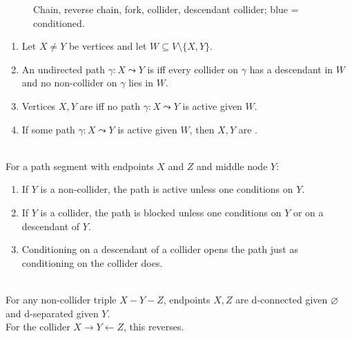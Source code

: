 \begin{figure}[H]
  \centering
  
  \caption{Chain, reverse chain, fork, collider, descendant collider; blue = conditioned.}
  \label{fig:d-separation-motifs}
\end{figure}

\begin{definition} \label{def:d-separation} 
\begin{enumerate}[label=(\roman*)]
\setlength{\itemsep}{0pt}
\item Let $X\neq Y$ be vertices and let $W\subseteq V\setminus\{X,Y\}$.
\item An undirected path $\gamma:X\leadsto Y$ is  iff every collider on $\gamma$ has a descendant in $W$ and no non-collider on $\gamma$ lies in $W$.
\item Vertices $X,Y$ are  iff no path $\gamma:X\leadsto Y$ is active given $W$.
\item If some path $\gamma:X\leadsto Y$ is active given $W$, then $X,Y$ are .
\end{enumerate}
\end{definition}

\begin{method} \label{meth:d-separation-rules} \\
For a path segment with endpoints $X$ and $Z$ and middle node $Y$:
\begin{enumerate}[label=(\roman*)]
\setlength{\itemsep}{0pt}
\item If $Y$ is a non-collider, the path is active unless one conditions on $Y$.
\item If $Y$ is a collider, the path is blocked unless one conditions on $Y$ or on a descendant of $Y$.
\item Conditioning on a descendant of a collider opens the path just as conditioning on the collider does.
\end{enumerate}
\end{method}

\begin{example} \label{ex:d-separation-chain-fork-collider} \\
For any non-collider triple $X-Y-Z$, endpoints $X,Z$ are d-connected given $\varnothing$ and d-separated given $Y$.\\
For the collider $X\to Y\leftarrow Z$, this reverses.
\end{example}


